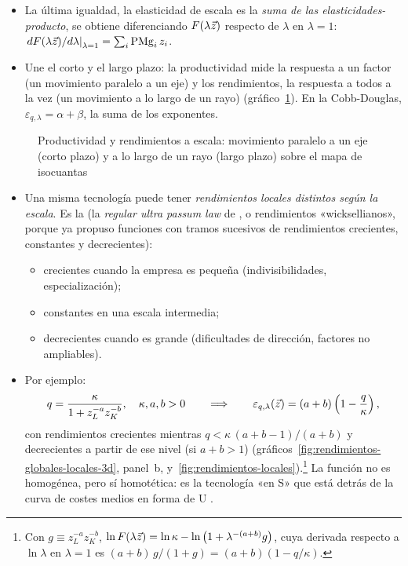 \documentclass[11pt]{article}
\begin{document}
\begin{itemize}
  \begin{itemize}
  \item La última igualdad, la elasticidad de escala es la \emph{suma de las elasticidades-producto}, se obtiene diferenciando $F(\lambda\vec{z})$ respecto de $\lambda$ en $\lambda=1$: $\left.dF(\lambda\vec{z})/d\lambda\right|_{\lambda=1}=\sum_i\mathrm{PMg}_i\,z_i$.
  \item Une el corto y el largo plazo: la productividad mide la respuesta a un factor (un movimiento paralelo a un eje) y los rendimientos, la respuesta a todos a la vez (un movimiento a lo largo de un rayo) (gráfico~\ref{fig:productividad-rendimientos}). En la Cobb-Douglas, $\varepsilon_{q,\lambda}=\alpha+\beta$, la suma de los exponentes.
  \end{itemize}
\end{itemize}

\begin{figure}[H]
\centering
\caption{Productividad y rendimientos a escala: movimiento paralelo a un eje (corto plazo) y a lo largo de un rayo (largo plazo) sobre el mapa de isocuantas}\label{fig:productividad-rendimientos}
\end{figure}

\begin{itemize}
\item Una misma tecnología puede tener \emph{rendimientos locales distintos según la escala}. Es la  (la \emph{regular ultra passum law} de \textcite{Frisch1965Theory}, o rendimientos «wicksellianos», porque  ya propuso funciones con tramos sucesivos de rendimientos crecientes, constantes y decrecientes):
  \begin{itemize}
  \item crecientes cuando la empresa es pequeña (indivisibilidades, especialización);
  \item constantes en una escala intermedia;
  \item decrecientes cuando es grande (dificultades de dirección, factores no ampliables).
  \end{itemize}
\item Por ejemplo\nocite{JehleReny2011Advanced}:
  \begin{equation}
  q=\frac{\kappa}{1+z_L^{-a}z_K^{-b}},\quad \kappa,a,b>0\qquad\Longrightarrow\qquad \varepsilon_{q,\lambda}(\vec{z})=(a+b)\left(1-\frac{q}{\kappa}\right), \label{eq:ejemplo-rendimientos-locales}
  \end{equation}
  con rendimientos crecientes mientras $q<\kappa\,(a+b-1)/(a+b)$ y decrecientes a partir de ese nivel (si $a+b>1$) (gráficos~\ref{fig:rendimientos-globales-locales-3d}, panel~b, y~\ref{fig:rendimientos-locales}).\footnote{Con $g\equiv z_L^{-a}z_K^{-b}$, $\ln F(\lambda\vec{z})=\ln\kappa-\ln\big(1+\lambda^{-(a+b)}g\big)$, cuya derivada respecto a $\ln\lambda$ en $\lambda=1$ es $(a+b)\,g/(1+g)=(a+b)(1-q/\kappa)$.\findemo} La función no es homogénea, pero sí homotética: es la tecnología «en S» que está detrás de la curva de costes medios en forma de U .
\end{itemize}
\end{document}
